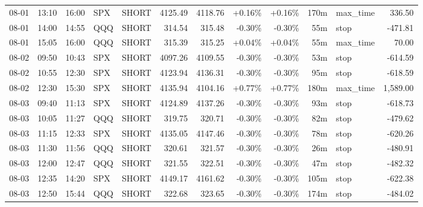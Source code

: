 \documentclass[11pt,a4paper,twoside]{article}
\begin{document}
\begin{center}
\begin{longtable}{>{\color{txtmain}}l l l l l r r r r r >{\color{txtmain}}l r}
08-01 & 13:10 & 16:00 & SPX & SHORT & 4125.49 & 4118.76 & \textcolor{wingreen}{+0.16\%} & \textcolor{wingreen}{+0.16\%} & 170m & max\_time & \textcolor{wingreen}{336.50} \\
08-01 & 14:00 & 14:55 & QQQ & SHORT & 314.54 & 315.48 & \textcolor{lossred}{-0.30\%} & \textcolor{lossred}{-0.30\%} & 55m & stop & \textcolor{lossred}{-471.81} \\
08-01 & 15:05 & 16:00 & QQQ & SHORT & 315.39 & 315.25 & \textcolor{wingreen}{+0.04\%} & \textcolor{wingreen}{+0.04\%} & 55m & max\_time & \textcolor{wingreen}{70.00} \\
08-02 & 09:50 & 10:43 & SPX & SHORT & 4097.26 & 4109.55 & \textcolor{lossred}{-0.30\%} & \textcolor{lossred}{-0.30\%} & 53m & stop & \textcolor{lossred}{-614.59} \\
08-02 & 10:55 & 12:30 & SPX & SHORT & 4123.94 & 4136.31 & \textcolor{lossred}{-0.30\%} & \textcolor{lossred}{-0.30\%} & 95m & stop & \textcolor{lossred}{-618.59} \\
08-02 & 12:30 & 15:30 & SPX & SHORT & 4135.94 & 4104.16 & \textcolor{wingreen}{+0.77\%} & \textcolor{wingreen}{+0.77\%} & 180m & max\_time & \textcolor{wingreen}{1,589.00} \\
08-03 & 09:40 & 11:13 & SPX & SHORT & 4124.89 & 4137.26 & \textcolor{lossred}{-0.30\%} & \textcolor{lossred}{-0.30\%} & 93m & stop & \textcolor{lossred}{-618.73} \\
08-03 & 10:05 & 11:27 & QQQ & SHORT & 319.75 & 320.71 & \textcolor{lossred}{-0.30\%} & \textcolor{lossred}{-0.30\%} & 82m & stop & \textcolor{lossred}{-479.62} \\
08-03 & 11:15 & 12:33 & SPX & SHORT & 4135.05 & 4147.46 & \textcolor{lossred}{-0.30\%} & \textcolor{lossred}{-0.30\%} & 78m & stop & \textcolor{lossred}{-620.26} \\
08-03 & 11:30 & 11:56 & QQQ & SHORT & 320.61 & 321.57 & \textcolor{lossred}{-0.30\%} & \textcolor{lossred}{-0.30\%} & 26m & stop & \textcolor{lossred}{-480.91} \\
08-03 & 12:00 & 12:47 & QQQ & SHORT & 321.55 & 322.51 & \textcolor{lossred}{-0.30\%} & \textcolor{lossred}{-0.30\%} & 47m & stop & \textcolor{lossred}{-482.32} \\
08-03 & 12:35 & 14:20 & SPX & SHORT & 4149.17 & 4161.62 & \textcolor{lossred}{-0.30\%} & \textcolor{lossred}{-0.30\%} & 105m & stop & \textcolor{lossred}{-622.38} \\
08-03 & 12:50 & 15:44 & QQQ & SHORT & 322.68 & 323.65 & \textcolor{lossred}{-0.30\%} & \textcolor{lossred}{-0.30\%} & 174m & stop & \textcolor{lossred}{-484.02} \\

\end{longtable}
\end{center}
\end{document}
